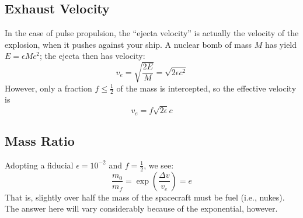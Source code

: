 \documentclass[a4paper]{article}
\begin{document}
    \subsection{Exhaust Velocity}
      In the case of pulse propulsion, the ``ejecta velocity'' is actually the velocity of the explosion, when it pushes against your ship.  A nuclear bomb of mass $M$ has yield $E = \epsilon Mc^{2}$; the ejecta then has velocity:
      \begin{equation}
        v_{e} = \sqrt{\frac{2E}{M}} = \sqrt{2\epsilon c^{2}}
      \end{equation}
      However, only a fraction $f\leq \frac{1}{2}$ of the mass is intercepted, so the effective velocity is
      \begin{equation}
       v_{e} = f\sqrt{2\epsilon} c
      \end{equation}
    
    \subsection{Mass Ratio}
      Adopting a fiducial $\epsilon=10^{-2}$ and $f=\frac{1}{2}$, we see:
      \begin{equation}
       \frac{m_{0}}{m_{f}} = \exp\left(\frac{\Delta v}{v_{e}}\right) = e
      \end{equation}
      That is, slightly over half the mass of the spacecraft must be fuel (i.e., nukes).  The answer here will vary considerably because of the exponential, however.
  
\end{document}
